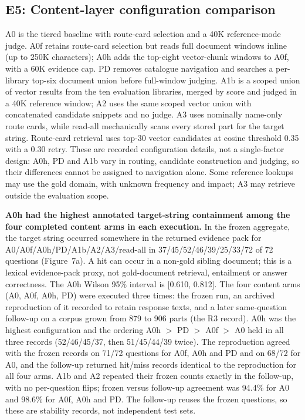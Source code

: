 \documentclass[11pt]{article}
\begin{document}
\subsection{E5: Content-layer configuration comparison}

A0 is the tiered baseline with route-card selection and a 40K reference-mode
judge. A0f retains route-card selection but reads full document windows
inline (up to 250K characters); A0h adds the top-eight vector-chunk windows
to A0f, with a 60K evidence cap. PD removes catalogue navigation and
searches a per-library top-six document union before full-window judging.
A1b is a scoped union of vector results from the ten evaluation libraries,
merged by score and judged in a 40K reference window; A2 uses the same
scoped vector union with concatenated candidate snippets and no judge. A3
uses nominally name-only route cards, while read-all mechanically scans
every stored part for the target string. Route-card retrieval uses
top-30 vector candidates at cosine threshold 0.35 with a 0.30 retry. These
are recorded configuration details, not a single-factor design: A0h, PD and
A1b vary in routing, candidate construction and judging, so their
differences cannot be assigned to navigation alone. Some reference lookups
may use the gold domain, with unknown frequency and impact; A3 may retrieve
outside the evaluation scope.

\textbf{A0h had the highest annotated target-string containment among the
four completed content arms in each execution.} In the frozen aggregate, the
target string occurred somewhere in the returned evidence pack for
A0/A0f/A0h/PD/A1b/A2/A3/read-all in 37/45/52/46/39/25/33/72 of 72 questions
(Figure~7a). A hit can occur in a non-gold sibling document;
this is a lexical evidence-pack proxy, not gold-document retrieval, entailment
or answer correctness. The A0h Wilson 95\% interval is [0.610, 0.812]. The four
content arms (A0, A0f, A0h, PD) were executed three times: the frozen run,
an archived reproduction of it recorded to retain response texts, and a later same-question follow-up on a
corpus grown from 879 to 906 parts (the R3 record). A0h
was the highest configuration and the ordering A0h $>$ PD $>$ A0f $>$ A0
held in all three records (52/46/45/37, then 51/45/44/39 twice). The
reproduction agreed with the frozen records on 71/72 questions for A0f, A0h
and PD and on 68/72 for A0, and the follow-up returned hit/miss records
identical to the reproduction for all four arms. A1b and A2 repeated their
frozen counts exactly in the follow-up, with no per-question flips; frozen
versus follow-up agreement was 94.4\% for A0 and 98.6\% for A0f, A0h and
PD. The follow-up reuses the frozen questions, so these are stability
records, not independent test sets.
\end{document}
